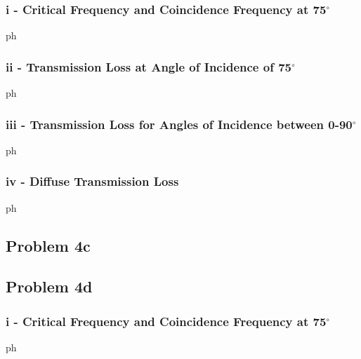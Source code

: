 {{{\vspace{0.25cm}
\subsubsection*{i - Critical Frequency and Coincidence Frequency at 75$^\circ$}

ph



\vspace{0.25cm}
\subsubsection*{ii - Transmission Loss at Angle of Incidence of 75$^\circ$}

ph



\vspace{0.25cm}
\subsubsection*{iii - Transmission Loss for Angles of Incidence between 0-90$^\circ$}

ph



\vspace{0.25cm}
\subsubsection*{iv - Diffuse Transmission Loss}

ph



\newpage
\subsection*{Problem 4c}



\subsection*{Problem 4d}

\vspace{0.25cm}
\subsubsection*{i - Critical Frequency and Coincidence Frequency at 75$^\circ$}

ph

\vspace{0.25cm}
}}}
